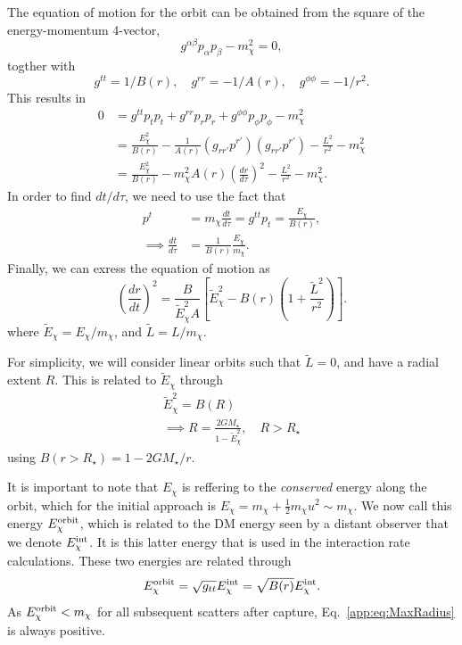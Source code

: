 The equation of motion for the orbit can be obtained from the square of the energy-momentum 4-vector,
\begin{equation}
g^{\alpha\beta} p_\alpha p_\beta - m_\chi^2 = 0,
\end{equation}
togther with
\begin{equation}    
g^{tt} = 1/B(r),\quad g^{rr} = -1/A(r),\quad g^{\phi \phi} = -1/r^2.
\end{equation}
This results in
\begin{align}
    0 & = g^{tt} p_t p_t + g^{rr} p_r p_r + g^{\phi\phi} p_\phi p_\phi - m_\chi^2 \\
    & = \frac{E_\chi^2}{B(r)} - \frac{1}{A(r)} \left( g_{rr'} p^{r'} \right)\left( g_{rr'} p^{r'} \right) - \frac{L^2}{r^2} - m_\chi^2 \\
    & = \frac{E_\chi^2}{B(r)} - m_\chi^2 A(r) \left( \frac{dr}{d\tau} \right)^2 - \frac{L^2}{r^2} - m_\chi^2.
\end{align}
In order to find $dt/d\tau$, we need to use the fact that
\begin{align}
    p^t & = m_\chi \frac{dt}{d\tau} = g^{tt}p_t = \frac{E_\chi}{B(r)},\\
    \implies \frac{dt}{d\tau} & = \frac{1}{B(r)}\frac{E_\chi}{m_\chi}.
\end{align}
Finally, we can exress the equation of motion as
\begin{equation}
    \left(\frac{dr}{dt} \right)^2 = \frac{B}{\tilde E_\chi^2 A} \left[\tilde E_\chi^2- B(r) \left(  1 + \frac{\tilde L^2}{r^2} \right) \right].
    \label{app:eq:drdt2GR}
\end{equation}
where $\tilde{E}_\chi = E_\chi/m_\chi$, and $\tilde{L} = L/m_\chi$.

For simplicity, we will consider linear orbits such that $\tilde L = 0$, and have a radial extent $R$. This is related to $\tilde E_\chi$ through
\begin{gather}
    \tilde E_\chi^2 = B(R)\label{app:eq:maxradgeneral}\\
    \implies R = \frac{2 G M_\star}{1 - \tilde E_\chi^2}, \quad R>R_\star
    \label{app:eq:MaxRadius}
\end{gather}
using $B(r>R_\star) = 1 - 2 G M_\star /r$.

It is important to note that $E_\chi$ is reffering to the \textit{conserved} energy along the orbit, 
which for the initial approach is $E_\chi = m_\chi + \frac{1}{2}m_\chi u^2\sim m_\chi$. 
We now call this energy $E_\chi^{\rm orbit}$, which is related to the DM energy seen by a distant observer that we denote $E_\chi^{\rm int}$. It is this latter energy that is used in the interaction rate calculations. These two energies are related through 
\begin{equation}
    E_\chi^{\rm orbit} = \sqrt{g_{tt}} E_\chi^{\rm int} = \sqrt{B(r)}E_\chi^{\rm int}.
\end{equation}
As $E_\chi^{\rm orbit} < m_\chi$ for all subsequent scatters after capture, Eq.~\ref{app:eq:MaxRadius} is always positive.

